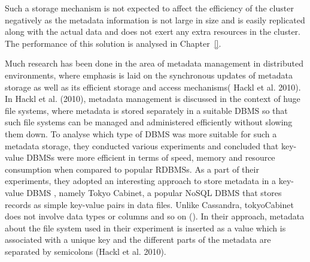 	Such a storage mechanism is not expected to affect the efficiency of the
	cluster negatively as the metadata information is not large in size and is
	easily replicated along with the actual data and does not exert any extra
	resources in the cluster.  The performance of this solution is analysed  in
	Chapter~\ref{}.

	Much research has been done in the area of  metadata management in distributed
	environments,  where emphasis is laid on the synchronous updates of metadata
	storage as well as its efficient storage and access mechanisms(
	Hackl et al.  2010).
	In Hackl et al.  (2010),  metadata management is discussed in the context of
	huge file systems, where metadata is stored separately in a suitable \ac{DBMS}
	so that such file systems can be managed and administered efficiently without
	slowing them down.  To analyse which type of \ac{DBMS} was more suitable for such a
	metadata storage,  they conducted various experiments and concluded that
	key-value \acp{DBMS} were more efficient in terms of speed,  memory and resource
	consumption when compared to popular \acp{RDBMS}.  As a part of their
	experiments, they adopted an interesting approach to store metadata in a
	key-value \ac{DBMS} ,  namely Tokyo Cabinet,  a popular \ac{NoSQL} \ac{DBMS}
	that stores records as simple key-value pairs in data files. Unlike Cassandra,
	tokyoCabinet does not involve data types or columns
	and so on ().  In their approach,  metadata about the file system
	used in their experiment is inserted as a value which is associated with a unique key and the
	different parts of the metadata are separated by semicolons (Hackl et al.  2010).
	